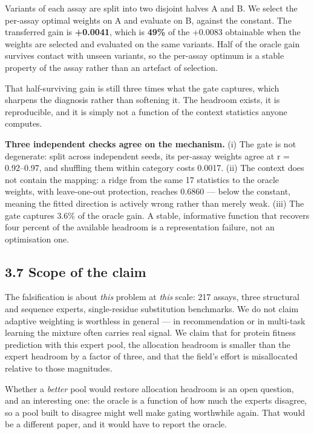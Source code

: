 Variants of each assay are split into two disjoint halves A and B. We select the per-assay optimal
weights on A and evaluate on B, against the constant. The transferred gain is \textbf{+0.0041}, which is
\textbf{49\%} of the +0.0083 obtainable when the weights are selected and evaluated on the same variants.
Half of the oracle gain survives contact with unseen variants, so the per-assay optimum is a stable
property of the assay rather than an artefact of selection.

That half-surviving gain is still three times what the gate captures, which sharpens the diagnosis
rather than softening it. The headroom exists, it is reproducible, and it is simply not a function of
the context statistics anyone computes.

\textbf{Three independent checks agree on the mechanism.} (i) The gate is not degenerate: split across
independent seeds, its per-assay weights agree at r = 0.92--0.97, and shuffling them within category
costs 0.0017. (ii) The context does not contain the mapping: a ridge from the same 17 statistics to the
oracle weights, with leave-one-out protection, reaches 0.6860 --- below the constant, meaning the fitted
direction is actively wrong rather than merely weak. (iii) The gate captures 3.6\% of the oracle gain.
A stable, informative function that recovers four percent of the available headroom is a representation
failure, not an optimisation one.

\hypertarget{scope-of-the-claim}{%
\subsection{3.7 Scope of the claim}\label{scope-of-the-claim}}

The falsification is about \emph{this} problem at \emph{this} scale: 217 assays, three structural and sequence
experts, single-residue substitution benchmarks. We do not claim adaptive weighting is worthless in
general --- in recommendation or in multi-task learning the mixture often carries real signal. We claim
that for protein fitness prediction with this expert pool, the allocation headroom is smaller than the
expert headroom by a factor of three, and that the field's effort is misallocated relative to those
magnitudes.

Whether a \emph{better} pool would restore allocation headroom is an open question, and an interesting one:
the oracle is a function of how much the experts disagree, so a pool built to disagree might well make
gating worthwhile again. That would be a different paper, and it would have to report the oracle.

